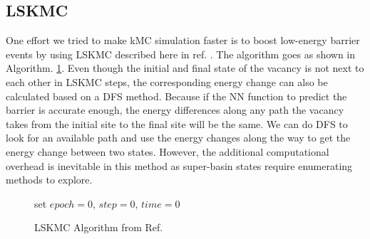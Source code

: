 \subsection{\acf{LSKMC}}
One effort we tried to make \ac{kMC} simulation faster is to boost low-energy barrier events by using \acf{LSKMC} described here in ref. \cite{fichthorn2013local}. The algorithm goes as shown in Algorithm. \ref{algo:lskmc}. Even though the initial and final state of the vacancy is not next to each other in \ac{LSKMC} steps, the corresponding energy change can also be calculated based on a \ac{DFS} method. Because if the \ac{NN} function to predict the barrier is accurate enough, the energy differences along any path the vacancy takes from the initial site to the final site will be the same. We can do \ac{DFS} to look for an available path and use the energy changes along the way to get the energy change between two states. However, the additional computational overhead is inevitable in this method as super-basin states require enumerating methods to explore.

\begin{figure}[!htb]
  \centering
  \begin{minipage}{.75\linewidth}
    \begin{algorithm}[H]
      \caption{\acf{LSKMC} Algorithm from  Ref. \cite{fichthorn2013local}}\label{algo:lskmc}
      \begin{algorithmic}[1]
        \State set $epoch = 0$, $step = 0$, $time = 0$
        \Else
        \EndIf
        \EndIf

        \EndWhile
      \end{algorithmic}
    \end{algorithm}
  \end{minipage}
\end{figure}


